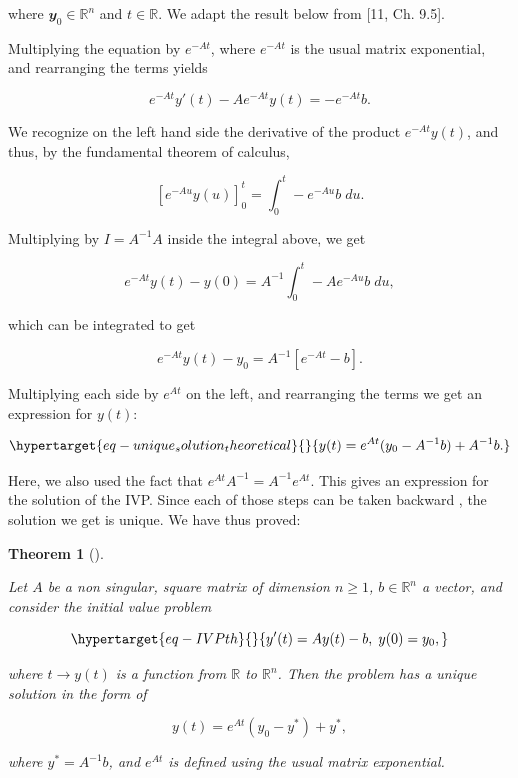 \documentclass[
  letterpaper,
]{report}
\theoremstyle{plain}
\newtheorem{theorem}{Theorem}[chapter]
\theoremstyle{definition}
\theoremstyle{definition}
\theoremstyle{remark}
\begin{document}
where \(\mathbfit{y}_0\in \mathbb{R}^n\) and \(t\in \mathbb{R}\). We
adapt the result below from {[}11, Ch. 9.5{]}.

Multiplying the equation by \(e^{-At}\), where \(e^{-At}\) is the usual
matrix exponential, and rearranging the terms yields

\[
e^{-At}y'(t) - Ae^{-At}y(t) = -e^{-At}b.
\]

We recognize on the left hand side the derivative of the product
\(e^{-At}y(t)\), and thus, by the fundamental theorem of calculus,

\[
\left[ e^{-Au}y(u)\right]_0^t = \int_0^t -e^{-Au}b \; du.
\]

Multiplying by \(I = A^{-1}A\) inside the integral above, we get

\[
e^{-At}y(t) - y(0) = A^{-1} \int_0^t -Ae^{-Au}b \; du,
\]

which can be integrated to get

\[
e^{-At}y(t) - y_0 = A^{-1}\left[e^{-At} - b\right].
\]

Multiplying each side by \(e^{At}\) on the left, and rearranging the
terms we get an expression for \(y(t)\):

\begin{equation}\protect\hypertarget{eq-unique_solution_theoretical}{}{
y(t) = e^{At}(y_0 - A^{-1}b) + A^{-1}b.
}\label{eq-unique_solution_theoretical}\end{equation}

Here, we also used the fact that \(e^{At}A^{-1} = A^{-1}e^{At}\). This
gives an expression for the solution of the IVP. Since each of those
steps can be taken backward , the solution we get is unique. We have
thus proved:

\leavevmode{}%
\begin{theorem}[]\label{thm-ODEtheoretical}

Let \(A\) be a non singular, square matrix of dimension \(n\geq 1\),
\(b\in\mathbb{R}^n\) a vector, and consider the initial value problem

\begin{equation}\protect\hypertarget{eq-IVPth}{}{
y'(t) = Ay(t) - b, \; y(0) = y_0,
}\label{eq-IVPth}\end{equation}

where \(t \rightarrow y(t)\) is a function from \(\mathbb{R}\) to
\(\mathbb{R}^n\). Then the problem has a unique solution in the form of

\[
y(t) = e^{At}(y_0 - y^*) + y^*,
\]

where \(y^* = A^{-1}b\), and \(e^{At}\) is defined using the usual
matrix exponential.

\end{theorem}
\end{document}
